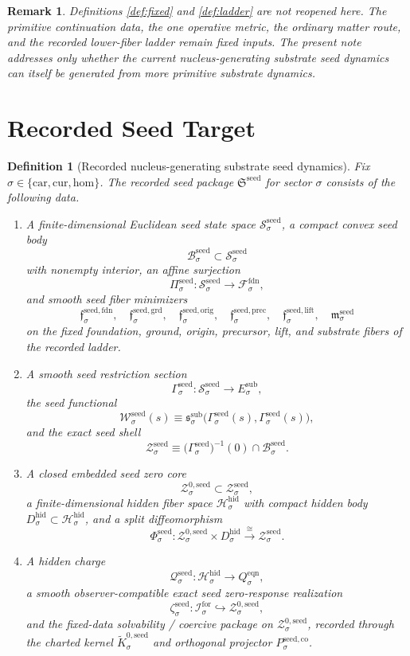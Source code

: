 \documentclass[11pt]{article}
\newcommand{\Car}{\mathrm{car}}
\newcommand{\Cur}{\mathrm{cur}}
\newcommand{\Hom}{\mathrm{hom}}
\newcommand{\ForSpace}[1]{\mathcal I_{#1}^{\mathrm{for}}}
\newcommand{\FoundSpace}[1]{\mathcal F_{#1}^{\mathrm{fdn}}}
\newcommand{\SubTarget}[1]{E_{#1}^{\mathrm{sub}}}
\newcommand{\SubPair}[1]{\mathfrak s_{#1}^{\mathrm{sub}}}
\newcommand{\EqnTarget}[1]{Q_{#1}^{\mathrm{eqn}}}
\newcommand{\HiddenSpace}[1]{\mathcal H_{#1}^{\mathrm{hid}}}
\newcommand{\HiddenBody}[1]{D_{#1}^{\mathrm{hid}}}
\newcommand{\SeedPackage}{\mathfrak S^{\mathrm{seed}}}
\newcommand{\SeedSpace}[1]{\mathcal S_{#1}^{\mathrm{seed}}}
\newcommand{\SeedBody}[1]{\mathcal B_{#1}^{\mathrm{seed}}}
\newcommand{\SeedProj}[1]{\Pi_{#1}^{\mathrm{seed}}}
\newcommand{\SeedFoundMin}[1]{\mathfrak f_{#1}^{\mathrm{seed,fdn}}}
\newcommand{\SeedGroundMin}[1]{\mathfrak f_{#1}^{\mathrm{seed,grd}}}
\newcommand{\SeedOrigMin}[1]{\mathfrak f_{#1}^{\mathrm{seed,orig}}}
\newcommand{\SeedPrecMin}[1]{\mathfrak f_{#1}^{\mathrm{seed,prec}}}
\newcommand{\SeedLiftMin}[1]{\mathfrak f_{#1}^{\mathrm{seed,lift}}}
\newcommand{\SeedSubMin}[1]{\mathfrak m_{#1}^{\mathrm{seed}}}
\newcommand{\SeedSection}[1]{\Gamma_{#1}^{\mathrm{seed}}}
\newcommand{\SeedFunctional}[1]{\mathscr W_{#1}^{\mathrm{seed}}}
\newcommand{\SeedShellSet}[1]{\mathcal Z_{#1}^{\mathrm{seed}}}
\newcommand{\SeedZeroCore}[1]{\mathcal Z_{#1}^{0,\mathrm{seed}}}
\newcommand{\SeedSplit}[1]{\Phi_{#1}^{\mathrm{seed}}}
\newcommand{\SeedCharge}[1]{\mathcal Q_{#1}^{\mathrm{seed}}}
\newcommand{\SeedEmbed}[1]{\zeta_{#1}^{\mathrm{seed}}}
\newcommand{\SeedKernelCh}[1]{\widetilde K_{#1}^{0,\mathrm{seed}}}
\newcommand{\SeedStateComp}[1]{P_{#1}^{\mathrm{seed,co}}}
\newtheorem{definition}{Definition}
\newtheorem{remark}{Remark}
\begin{document}
\begin{remark}
Definitions \ref{def:fixed} and \ref{def:ladder} are not reopened here. The primitive continuation data, the one operative metric, the ordinary matter route, and the recorded lower-fiber ladder remain fixed inputs. The present note addresses only whether the current nucleus-generating substrate seed dynamics can itself be generated from more primitive substrate dynamics.
\end{remark}

\section{Recorded Seed Target}

\begin{definition}[Recorded nucleus-generating substrate seed dynamics]
\label{def:seed}
Fix \(\sigma\in\{\Car,\Cur,\Hom\}\). The recorded seed package \(\SeedPackage\) for sector \(\sigma\) consists of the following data.
\begin{enumerate}
    \item A finite-dimensional Euclidean seed state space \(\SeedSpace{\sigma}\), a compact convex seed body
    \[
    \SeedBody{\sigma}\subset\SeedSpace{\sigma}
    \]
    with nonempty interior, an affine surjection
    \[
    \SeedProj{\sigma}:\SeedSpace{\sigma}\to\FoundSpace{\sigma},
    \]
    and smooth seed fiber minimizers
    \[
    \SeedFoundMin{\sigma},\quad
    \SeedGroundMin{\sigma},\quad
    \SeedOrigMin{\sigma},\quad
    \SeedPrecMin{\sigma},\quad
    \SeedLiftMin{\sigma},\quad
    \SeedSubMin{\sigma}
    \]
    on the fixed foundation, ground, origin, precursor, lift, and substrate fibers of the recorded ladder.
    \item A smooth seed restriction section
    \[
    \SeedSection{\sigma}:\SeedSpace{\sigma}\to\SubTarget{\sigma},
    \]
    the seed functional
    \[
    \SeedFunctional{\sigma}(s)
    \equiv
    \SubPair{\sigma}\bigl(\SeedSection{\sigma}(s),\SeedSection{\sigma}(s)\bigr),
    \]
    and the exact seed shell
    \[
    \SeedShellSet{\sigma}
    \equiv
    \bigl(\SeedSection{\sigma}\bigr)^{-1}(0)\cap\SeedBody{\sigma}.
    \]
    \item A closed embedded seed zero core
    \[
    \SeedZeroCore{\sigma}\subset\SeedShellSet{\sigma},
    \]
    a finite-dimensional hidden fiber space \(\HiddenSpace{\sigma}\) with compact hidden body \(\HiddenBody{\sigma}\subset\HiddenSpace{\sigma}\), and a split diffeomorphism
    \[
    \SeedSplit{\sigma}:
    \SeedZeroCore{\sigma}\times\HiddenBody{\sigma}
    \xrightarrow{\cong}
    \SeedShellSet{\sigma}.
    \]
    \item A hidden charge
    \[
    \SeedCharge{\sigma}:\HiddenSpace{\sigma}\to\EqnTarget{\sigma},
    \]
    a smooth observer-compatible exact seed zero-response realization
    \[
    \SeedEmbed{\sigma}:\ForSpace{\sigma}\hookrightarrow\SeedZeroCore{\sigma},
    \]
    and the fixed-data solvability / coercive package on \(\SeedZeroCore{\sigma}\), recorded through the charted kernel \(\SeedKernelCh{\sigma}\) and orthogonal projector \(\SeedStateComp{\sigma}\).
\end{enumerate}
\end{definition}
\end{document}
